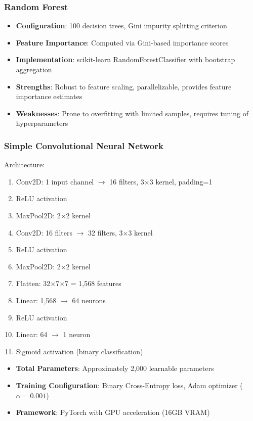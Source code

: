 \documentclass[11pt,a4paper]{article}
\begin{document}
\subsubsection{Random Forest}

\begin{itemize}
    \item \textbf{Configuration}: 100 decision trees, Gini impurity splitting criterion
    \item \textbf{Feature Importance}: Computed via Gini-based importance scores
    \item \textbf{Implementation}: scikit-learn RandomForestClassifier with bootstrap aggregation
    \item \textbf{Strengths}: Robust to feature scaling, parallelizable, provides feature importance estimates
    \item \textbf{Weaknesses}: Prone to overfitting with limited samples, requires tuning of hyperparameters
\end{itemize}

\subsubsection{Simple Convolutional Neural Network}

Architecture:
\begin{enumerate}
    \item Conv2D: 1 input channel $\rightarrow$ 16 filters, 3×3 kernel, padding=1
    \item ReLU activation
    \item MaxPool2D: 2×2 kernel
    \item Conv2D: 16 filters $\rightarrow$ 32 filters, 3×3 kernel
    \item ReLU activation
    \item MaxPool2D: 2×2 kernel
    \item Flatten: 32×7×7 = 1,568 features
    \item Linear: 1,568 $\rightarrow$ 64 neurons
    \item ReLU activation
    \item Linear: 64 $\rightarrow$ 1 neuron
    \item Sigmoid activation (binary classification)
\end{enumerate}

\begin{itemize}
    \item \textbf{Total Parameters}: Approximately 2,000 learnable parameters
    \item \textbf{Training Configuration}: Binary Cross-Entropy loss, Adam optimizer (\(\alpha=0.001\))
    \item \textbf{Framework}: PyTorch with GPU acceleration (16GB VRAM)
\end{itemize}
\end{document}
